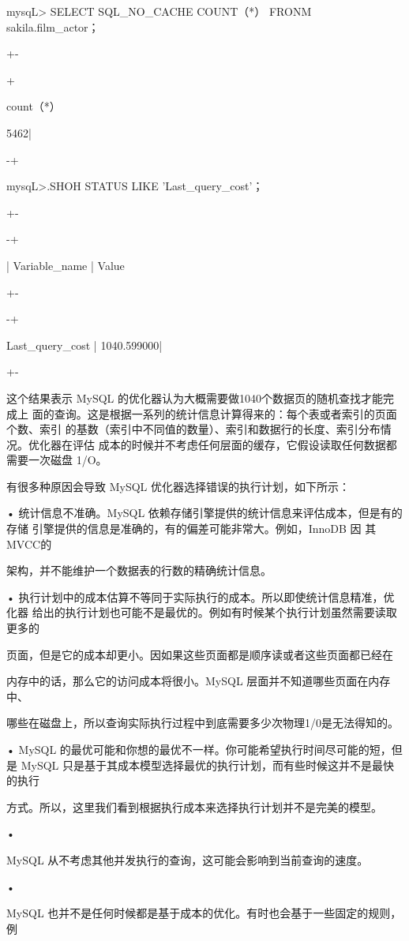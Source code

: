 mysqL> SELECT SQL\_NO\_CACHE COUNT（*） FRONM sakila.film\_actor；

+-

+

count（*）

5462|

-+

mysqL>.SHOH STATUS LIKE 'Last\_query\_cost'；

+-

-+

| Variable\_name | Value

+-

-+

Last\_query\_cost | 1040.599000|

+-

这个结果表示 MySQL 的优化器认为大概需要做1040个数据页的随机查找才能完成上
面的查询。这是根据一系列的统计信息计算得来的：每个表或者索引的页面个数、索引
的基数（索引中不同值的数量）、索引和数据行的长度、索引分布情况。优化器在评估
成本的时候并不考虑任何层面的缓存，它假设读取任何数据都需要一次磁盘 1/O。

有很多种原因会导致 MySQL 优化器选择错误的执行计划，如下所示：

• 统计信息不准确。MySQL 依赖存储引擎提供的统计信息来评估成本，但是有的存储
引擎提供的信息是准确的，有的偏差可能非常大。例如，InnoDB 因 其MVCC的

架构，并不能维护一个数据表的行数的精确统计信息。

• 执行计划中的成本估算不等同于实际执行的成本。所以即使统计信息精准，优化器
给出的执行计划也可能不是最优的。例如有时候某个执行计划虽然需要读取更多的

页面，但是它的成本却更小。因如果这些页面都是顺序读或者这些页面都已经在

内存中的话，那么它的访问成本将很小。MySQL 层面并不知道哪些页面在内存中、

哪些在磁盘上，所以查询实际执行过程中到底需要多少次物理1/0是无法得知的。

• MySQL 的最优可能和你想的最优不一样。你可能希望执行时间尽可能的短，但是
MySQL 只是基于其成本模型选择最优的执行计划，而有些时候这并不是最快的执行

方式。所以，这里我们看到根据执行成本来选择执行计划并不是完美的模型。

•

MySQL 从不考虑其他并发执行的查询，这可能会影响到当前查询的速度。

•

MySQL 也并不是任何时候都是基于成本的优化。有时也会基于一些固定的规则，例

